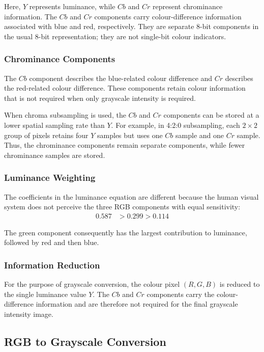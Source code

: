 Here, $Y$ represents luminance, while $Cb$ and $Cr$ represent
chrominance information. The $Cb$ and $Cr$ components carry colour-difference
information associated with blue and red, respectively. They are separate
8-bit components in the usual 8-bit representation; they are not single-bit
colour indicators.

\subsubsection{Chrominance Components}

The $Cb$ component describes the blue-related colour difference and
$Cr$ describes the red-related colour difference. These components
retain colour information that is not required when only grayscale
intensity is required.

When chroma subsampling is used, the $Cb$ and $Cr$ components can be
stored at a lower spatial sampling rate than $Y$. For example, in 4:2:0
subsampling, each $2\times2$ group of pixels retains four $Y$ samples but
uses one $Cb$ sample and one $Cr$ sample. Thus, the chrominance components
remain separate components, while fewer chrominance samples are stored.

\subsubsection{Luminance Weighting}

The coefficients in the luminance equation are different because the
human visual system does not perceive the three RGB components with
equal sensitivity:
\begin{align}
0.587&>0.299>0.114\label{eq:app_luminance_weights}
\end{align}

The green component consequently has the largest contribution to
luminance, followed by red and then blue.

\subsubsection{Information Reduction}

For the purpose of grayscale conversion, the colour pixel $(R,G,B)$ is
reduced to the single luminance value $Y$. The $Cb$ and $Cr$ components
carry the colour-difference information and are therefore not required
for the final grayscale intensity image.

\subsection{RGB to Grayscale Conversion}

